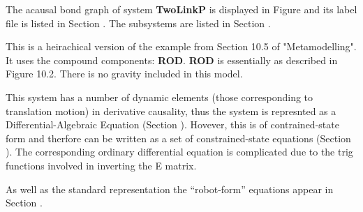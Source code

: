 
%

   The acausal bond graph of system \textbf{TwoLinkP} is
   displayed in Figure  and its label
   file is listed in Section .
   The subsystems are listed in Section .

This is a heirachical version of the example from Section 10.5 of
"Metamodelling".  It uses the compound components: {\bf ROD}.  {\bf
ROD} is essentially as described in Figure 10.2.
There is no gravity included in this model.

This system has a number of dynamic elements (those corresponding to translation
motion) in derivative causality, thus the system is represnted as a
Differential-Algebraic Equation (Section
). Hovever, this is of contrained-state form and
therfore can be written as a set of constrained-state equations (Section
). The corresponding ordinary differential
equation is complicated due to the trig functions involved in
inverting the E matrix.

As well as the standard representation the ``robot-form'' equations
appear in Section  . 


